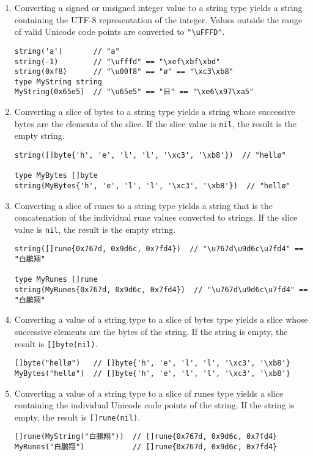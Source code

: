 \begin{enumerate}
\item
  Converting a signed or unsigned integer value to a string type yields
  a string containing the UTF-8 representation of the integer. Values
  outside the range of valid Unicode code points are converted to
  \texttt{"\textbackslash{}uFFFD"}.

\begin{Verbatim}[frame=single]
string('a')       // "a"
string(-1)        // "\ufffd" == "\xef\xbf\xbd"
string(0xf8)      // "\u00f8" == "ø" == "\xc3\xb8"
type MyString string
MyString(0x65e5)  // "\u65e5" == "日" == "\xe6\x97\xa5"
\end{Verbatim}
\item
  Converting a slice of bytes to a string type yields a string whose
  successive bytes are the elements of the slice. If the slice value is
  \texttt{nil}, the result is the empty string.

\begin{Verbatim}[frame=single]
string([]byte{'h', 'e', 'l', 'l', '\xc3', '\xb8'})  // "hellø"

type MyBytes []byte
string(MyBytes{'h', 'e', 'l', 'l', '\xc3', '\xb8'})  // "hellø"
\end{Verbatim}
\item
  Converting a slice of runes to a string type yields a string that is
  the concatenation of the individual rune values converted to strings.
  If the slice value is \texttt{nil}, the result is the empty string.

\begin{Verbatim}[frame=single]
string([]rune{0x767d, 0x9d6c, 0x7fd4})  // "\u767d\u9d6c\u7fd4" == "白鵬翔"

type MyRunes []rune
string(MyRunes{0x767d, 0x9d6c, 0x7fd4})  // "\u767d\u9d6c\u7fd4" == "白鵬翔"
\end{Verbatim}
\item
  Converting a value of a string type to a slice of bytes type yields a
  slice whose successive elements are the bytes of the string. If the
  string is empty, the result is \texttt{{[}{]}byte(nil)}.

\begin{Verbatim}[frame=single]
[]byte("hellø")   // []byte{'h', 'e', 'l', 'l', '\xc3', '\xb8'}
MyBytes("hellø")  // []byte{'h', 'e', 'l', 'l', '\xc3', '\xb8'}
\end{Verbatim}
\item
  Converting a value of a string type to a slice of runes type yields a
  slice containing the individual Unicode code points of the string. If
  the string is empty, the result is \texttt{{[}{]}rune(nil)}.

\begin{Verbatim}[frame=single]
[]rune(MyString("白鵬翔"))  // []rune{0x767d, 0x9d6c, 0x7fd4}
MyRunes("白鵬翔")           // []rune{0x767d, 0x9d6c, 0x7fd4}
\end{Verbatim}
\end{enumerate}

